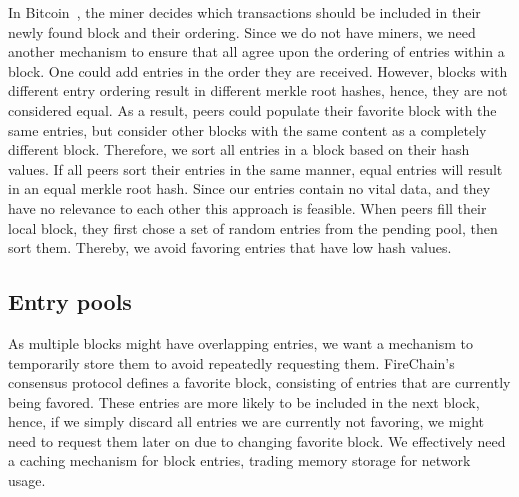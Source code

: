 \documentclass[USenglish]{uit-thesis}
\begin{document}
In Bitcoin~\cite{bitcoin}, the miner decides which transactions should be included in their newly found block and their ordering.
Since we do not have miners, we need another mechanism to ensure that all agree upon the ordering of entries within a block.
One could add entries in the order they are received.
However, blocks with different entry ordering result in different merkle root hashes, hence, they are not considered equal.
As a result, peers could populate their favorite block with the same entries, but consider other blocks with the same content as a completely different block.
Therefore, we sort all entries in a block based on their hash values.
If all peers sort their entries in the same manner, equal entries will result in an equal merkle root hash.
Since our entries contain no vital data, and they have no relevance to each other this approach is feasible.
When peers fill their local block, they first chose a set of random entries from the pending pool, then sort them.
Thereby, we avoid favoring entries that have low hash values.




\subsection{Entry pools}\label{sec:pools}
As multiple blocks might have overlapping entries, we want a mechanism to temporarily store them to avoid repeatedly requesting them.
FireChain's consensus protocol defines a favorite block, consisting of entries that are currently being favored.
These entries are more likely to be included in the next block, hence, if we simply discard all entries we are currently not favoring, we might need to request them later on due to changing favorite block.
We effectively need a caching mechanism for block entries, trading memory storage for network usage.
\end{document}
